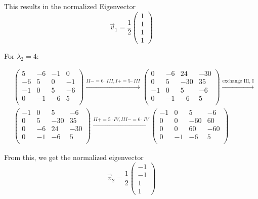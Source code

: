 \documentclass[a4paper,german,12pt,smallheadings]{scrartcl}
\begin{document}
\begin{enumerate}[a)]
    This results in the normalized Eigenvector
    \begin{equation*}
      \vec{v}_1 = \frac{1}{2} \begin{pmatrix}1 \\ 1 \\ 1 \\ 1\end{pmatrix}
    \end{equation*}

    For $\lambda_2 = 4$:

    \begin{align*}
      &\begin{pmatrix}
        5 & -6 & -1 & 0 \\
        -6 & 5 & 0 & -1 \\
        -1 & 0 & 5 & -6 \\
        0 & -1 & -6 & 5 \\
      \end{pmatrix}
      \xrightarrow{II -= 6 \cdot III, I += 5 \cdot III}
      \begin{pmatrix}
        0 & -6 & 24 & -30 \\
        0 & 5 & -30 & 35 \\
        -1 & 0 & 5 & -6 \\
        0 & -1 & -6 & 5\\
      \end{pmatrix}
      \xrightarrow{\text{exchange III, I}} \\
      &\begin{pmatrix}
        -1 & 0 & 5 & -6 \\
        0 & 5 & -30 & 35 \\
        0 & -6 & 24 & -30 \\
        0 & -1 & -6 & 5\\
      \end{pmatrix}
      \xrightarrow{II += 5 \cdot IV, III-=6 \cdot IV}
      \begin{pmatrix}
        -1 & 0 & 5 & -6 \\
        0 & 0 & -60 & 60 \\
        0 & 0 & 60 & -60 \\
        0 & -1 & -6 & 5\\
      \end{pmatrix}
    \end{align*}

    From this, we get the normalized eigenvector
    \begin{equation*}
    \vec{v}_2 = \frac{1}{2} \begin{pmatrix} -1 \\ -1 \\ 1 \\ 1 \end{pmatrix}
    \end{equation*}


\end{enumerate}
\end{document}
